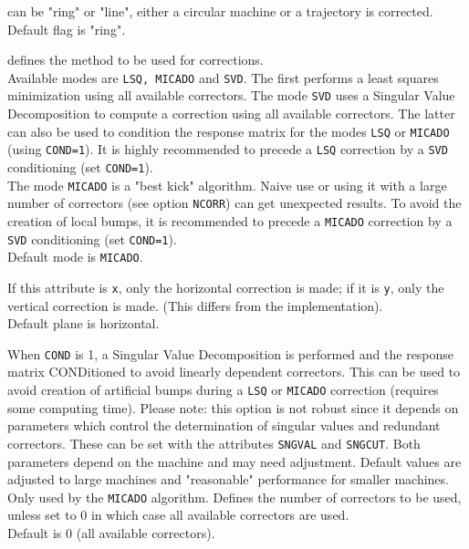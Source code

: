 \begin{madlist}
    can be "ring" or "line", either a circular machine
     or a trajectory is corrected.   
     \\ Default flag is "ring". 

    defines the method to be used for corrections. 
     \\ Available modes are {\tt LSQ, MICADO} and {\tt SVD}.  
     The first performs a
     least squares minimization using all available correctors. The mode
     {\tt SVD} uses a Singular Value Decomposition to compute a correction
     using all available correctors. The latter can also be used to
     condition the response matrix for the modes {\tt LSQ} or {\tt MICADO} (using
     {\tt COND=1}). It is highly recommended to precede a {\tt LSQ} correction by a
     {\tt SVD} conditioning (set {\tt COND=1}).  
     \\ The mode {\tt MICADO} is a "best kick" algorithm. Naive use or using
     it with a large number of correctors (see option {\tt NCORR}) can get
     unexpected results. To avoid the creation of local bumps, it is
     recommended to precede a {\tt MICADO} correction by a {\tt SVD} conditioning
     (set {\tt COND=1}).  
     \\ Default mode is {\tt MICADO}.            

    If this attribute is {\tt x}, only the horizontal correction
     is made; if it is {\tt y}, only the vertical correction is made. (This
     differs from the \madeight implementation).  
     \\ Default plane is horizontal. 

    When {\tt COND} is 1, a Singular Value Decomposition is
     performed and  the response matrix CONDitioned to avoid linearly
     dependent correctors. This can be used to avoid creation of
     artificial bumps during a {\tt LSQ} or {\tt MICADO} correction (requires some
     computing time).  Please note: this option is not robust since it
     depends on parameters which control the determination of singular
     values and redundant correctors. These can be set with the attributes
     {\tt SNGVAL} and {\tt SNGCUT}. Both parameters depend on the machine and may
     need adjustment. Default values are adjusted to large machines and
     "reasonable" performance for smaller machines.  
     \\

    Only used by the {\tt MICADO} algorithm. Defines the number of
     correctors to be used, unless set to 0 in which case all available
     correctors are used.  
     \\ Default is 0 (all available correctors). 


\end{madlist}
